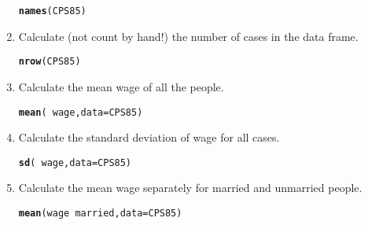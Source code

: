 \documentclass[10pt]{article}\usepackage[]{graphicx}\usepackage[]{color}
\makeatletter
\newcommand{\hlopt}[1]{\textcolor[rgb]{0,0,0}{#1}}%
\newcommand{\hlstd}[1]{\textcolor[rgb]{0.345,0.345,0.345}{#1}}%
\newcommand{\hlkwc}[1]{\textcolor[rgb]{0.333,0.667,0.333}{#1}}%
\newcommand{\hlkwd}[1]{\textcolor[rgb]{0.737,0.353,0.396}{\textbf{#1}}}%
\newenvironment{kframe}{%
 \def\at@end@of@kframe{}%
 \ifinner\ifhmode%
  \def\at@end@of@kframe{\end{minipage}}%
  \begin{minipage}{\columnwidth}%
 \fi\fi%
 \def\FrameCommand##1{\hskip\@totalleftmargin \hskip-\fboxsep
 \colorbox{shadecolor}{##1}\hskip-\fboxsep
     \hskip-\linewidth \hskip-\@totalleftmargin \hskip\columnwidth}%
 \MakeFramed {\advance\hsize-\width
   \@totalleftmargin\z@ \linewidth\hsize
   \@setminipage}}%
 {\par\unskip\endMakeFramed%
 \at@end@of@kframe}
\newenvironment{knitrout}{}{} %
\makeatother
\begin{document}
\begin{enumerate}
\begin{knitrout}
\color{fgcolor}\begin{kframe}
\begin{alltt}
\hlkwd{names}\hlstd{(CPS85)}
\end{alltt}
\end{kframe}
\end{knitrout}


\item Calculate (not count by hand!) the number of cases in the data frame.

\begin{knitrout}
\color{fgcolor}\begin{kframe}
\begin{alltt}
\hlkwd{nrow}\hlstd{(CPS85)}
\end{alltt}
\end{kframe}
\end{knitrout}


\item Calculate the mean wage of all the people.

\begin{knitrout}
\color{fgcolor}\begin{kframe}
\begin{alltt}
\hlkwd{mean}\hlstd{(}\hlopt{~} \hlstd{wage,} \hlkwc{data}\hlstd{=CPS85)}
\end{alltt}
\end{kframe}
\end{knitrout}

\item Calculate the standard deviation of wage for all cases.

\begin{knitrout}
\color{fgcolor}\begin{kframe}
\begin{alltt}
\hlkwd{sd}\hlstd{(}\hlopt{~} \hlstd{wage,} \hlkwc{data}\hlstd{=CPS85)}
\end{alltt}
\end{kframe}
\end{knitrout}

\item Calculate the mean wage separately for married and unmarried people.

\begin{knitrout}
\color{fgcolor}\begin{kframe}
\begin{alltt}
\hlkwd{mean}\hlstd{(wage} \hlopt{~} \hlstd{married,} \hlkwc{data}\hlstd{=CPS85)}
\end{alltt}
\end{kframe}
\end{knitrout}


\end{enumerate}
\end{document}
